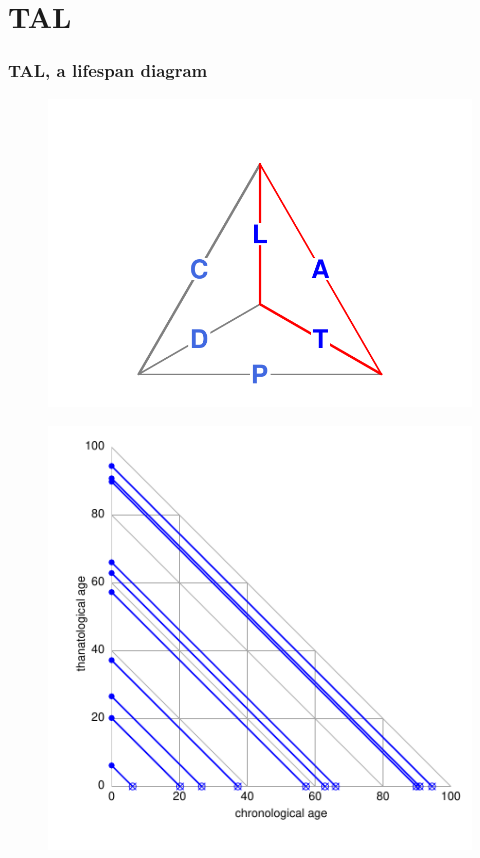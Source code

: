 \documentclass[20pt]{beamer}
\begin{document}
\section{TAL}
\begin{frame}
\frametitle{TAL, a lifespan diagram}
\vspace{-5em}
\begin{figure}
\raggedleft
    \includegraphics[scale=.7]{Figures/TetraTALprg.pdf}
\end{figure}
\vspace{-5em}
\begin{figure}[b]
    \centering
    \includegraphics{Figures/LabPres/ATL2.pdf}
\end{figure} 
\end{frame}
\end{document}
